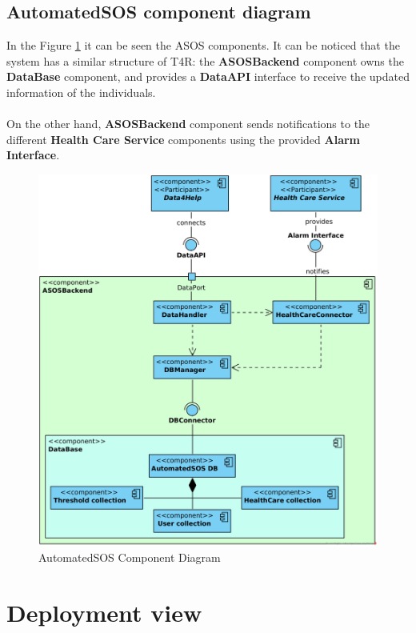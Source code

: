 \documentclass[a4paper, hidelinks, 12pt]{report}
\begin{document}
			\subsection{AutomatedSOS component diagram}	
			In the Figure \ref{fig:asos_component_diagram} it can be seen the ASOS components. It can be noticed that the system has a similar structure of T4R: the \textbf{ASOSBackend} component owns the \textbf{DataBase} component, and provides a \textbf{DataAPI} interface to receive the updated information of the individuals.\\\\
			On the other hand, \textbf{ASOSBackend} component sends notifications to the different \textbf{Health Care Service} components using the provided \textbf{Alarm Interface}.
			\begin{figure}[H]
				\centering
				\includegraphics[width=1\textwidth]{diagrams/asos_component_diagram.png}
				\caption[AutomatedSOS Component Diagram]{AutomatedSOS Component Diagram}
				\label{fig:asos_component_diagram}
			\end{figure}	
			
			
	\section{Deployment view}
	
\end{document}
